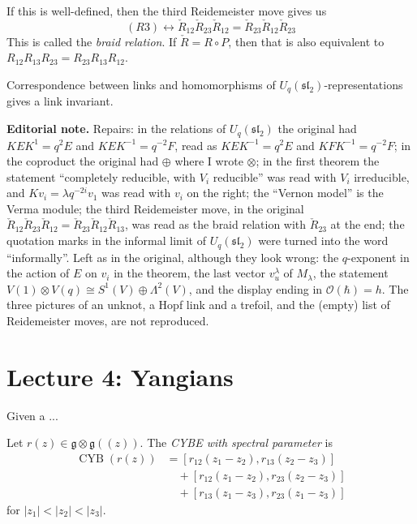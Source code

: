 If this is well-defined, then the third
Reidemeister move gives us
$$
(R 3)\longleftrightarrow
\check R_{12}\check R_{23}\check R_{12}=
\check R_{23}\check R_{12}\check R_{23}
$$
This is called the {\it braid relation}.
If $\check R=R\circ P$, then that is also
equivalent to
$R_{12}R_{13}R_{23}=R_{23}R_{13}R_{12}$.

\begin{theorem}
\label{theorem-l3-link-invariant}
Correspondence between links and
homomorphisms of
$U_{q}(\mathfrak{sl}_{2})$-representations
gives a link invariant.
\end{theorem}

\medskip\noindent
{\bf Editorial note.}
Repairs: in the relations of
$U_{q}(\mathfrak{sl}_{2})$ the original had
$KEK^{1}=q^{2}E$ and
$KEK^{-1}=q^{-2}F$, read as
$KEK^{-1}=q^{2}E$ and
$KFK^{-1}=q^{-2}F$; in the coproduct the
original had $\oplus$ where I wrote
$\otimes$; in the first theorem the
statement ``completely reducible, with
$V_{i}$ reducible'' was read with $V_{i}$
irreducible, and $Kv_{i}=\lambda q^{-2i}
v_{1}$ was read with $v_{i}$ on the right;
the ``Vernon model'' is the Verma module;
the third Reidemeister move, in the
original $\check R_{12}\check R_{23}
\check R_{12}=\check R_{23}\check R_{12}
\check R_{13}$, was read as the braid
relation with $\check R_{23}$ at the end;
the quotation marks in the informal limit
of $U_{q}(\mathfrak{sl}_{2})$ were turned
into the word ``informally''. Left as in
the original, although they look wrong:
the $q$-exponent in the action of $E$ on
$v_{i}$ in the theorem, the last vector
$v_{u}^{\lambda}$ of $M_{\lambda}$, the
statement $V(1)\otimes V(q)\cong
S^{1}(V)\oplus\Lambda^{2}(V)$, and the
display ending in $\mathcal{O}(\hbar)=h$.
The three pictures of an unknot, a Hopf
link and a trefoil, and the (empty)
list of Reidemeister moves, are not
reproduced.

\section{Lecture 4: Yangians}
\label{section-lecture-4}

\begin{proposition}
\label{proposition-l4-given}
Given a ...
\end{proposition}

\begin{definition}
\label{definition-l4-cybe-spectral}
Let $r(z)\in \mathfrak{g}\otimes
\mathfrak{g}((z))$. The {\it CYBE with
spectral parameter} is
$$
\begin{aligned}
\operatorname{CYB}(r(z))&=
[r_{12}(z_{1}-z_{2}),r_{13}(z_{2}-z_{3})]\\
&\quad +[r_{12}(z_{1}-z_{2}),
r_{23}(z_{2}-z_{3})]\\
&\quad +[r_{13}(z_{1}-z_{3}),
r_{23}(z_{1}-z_{3})]
\end{aligned}
$$
for $|z_{1}|<|z_{2}| <|z_{3}|$.
\end{definition}

